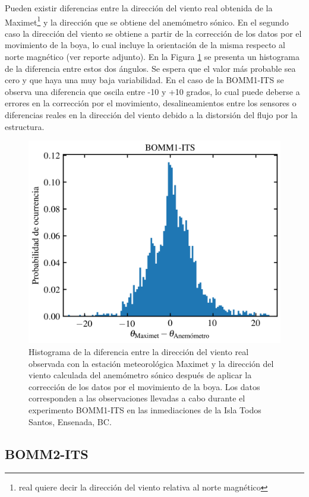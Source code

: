 \documentclass[11pt]{article}
\begin{document}
Pueden existir diferencias entre la dirección del viento real obtenida de la
Maximet\footnote{real quiere decir la dirección del viento relativa al norte
magnético} y la dirección que se obtiene del anemómetro sónico. En el segundo
caso la dirección del viento se obtiene a partir de la corrección de los datos
por el movimiento de la boya, lo cual incluye la orientación de la misma
respecto al norte magnético (ver reporte adjunto). En la Figura
\ref{fig:bomm1_its_wind_direction_histogram} se presenta un histograma de la
diferencia entre estos dos ángulos. Se espera que el valor más probable sea cero
y que haya una muy baja variabilidad. En el caso de la BOMM1-ITS se observa una
diferencia que oscila entre -10 y +10 grados, lo cual puede deberse a errores en
la corrección por el movimiento, desalineamientos entre los sensores o
diferencias reales en la dirección del viento debido a la distorsión del flujo
por la estructura.

\begin{figure}[htpb]
  \centering
  \includegraphics[width=0.5\linewidth]{../figures/bomm1_its_wind_direction_histogram.png}
  \caption{
    Histograma de la diferencia entre la dirección del viento real observada con
    la estación meteorológica Maximet y la dirección del viento calculada del
    anemómetro sónico después de aplicar la corrección de los datos por el
    movimiento de la boya. Los datos corresponden a las observaciones llevadas a
    cabo durante el experimento BOMM1-ITS en las inmediaciones de la Isla Todos
    Santos, Ensenada, BC.
  }
  \label{fig:bomm1_its_wind_direction_histogram}
\end{figure}



\subsection{BOMM2-ITS}
\label{sub:bomm2_its}
\end{document}
